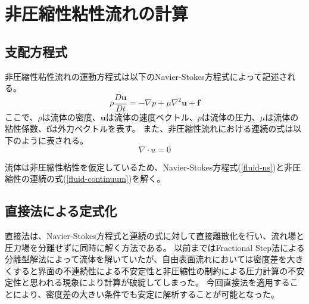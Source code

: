 \newpage
\section{非圧縮性粘性流れの計算}\label{sec:fluid}
\subsection{支配方程式}
非圧縮性粘性流れの運動方程式は以下のNavier-Stokes方程式によって記述される。
\begin{equation}
\label{fluid-ns}
\rho \frac{D\bm{u}}{Dt} = - \nabla p + \mu \nabla^{2} \bm{u} + \bm{f}
\end{equation}
ここで、$\rho$は流体の密度、$\bm{u}$は流体の速度ベクトル、$p$は流体の圧力、$\mu$は流体の粘性係数、$\bm{f}$は外力ベクトルを表す。
また、非圧縮性流れにおける連続の式は以下のように表される。
\begin{equation}
\label{fluid-continuum}
\nabla \cdot u = 0
\end{equation}

流体は非圧縮性粘性を仮定しているため、Navier-Stokes方程式(\ref{fluid-ns})と非圧縮性の連続の式(\ref{fluid-continuum})を解く。

\subsection{直接法による定式化}
直接法は、Navier-Stokes方程式と連続の式に対して直接離散化を行い、流れ場と圧力場を分離せずに同時に解く方法である。
以前まではFractional Step法による分離型解法によって流体を解いていたが、自由表面流れにおいては密度差を大きくすると界面の不連続性による不安定性と非圧縮性の制約による圧力計算の不安定性と思われる現象により計算が破綻してしまった。
今回直接法を適用することにより、密度差の大きい条件でも安定に解析することが可能となった。

